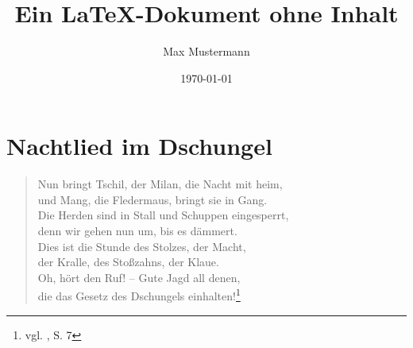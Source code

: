 \documentclass{../hswarticle}
\title{Ein \LaTeX -Dokument ohne Inhalt}
\author{Max Mustermann}
\date{\today}
\begin{document}
    \tableofcontents
    
    \section{Nachtlied im Dschungel}
    
    \begin{quote}
        \glqq Nun bringt Tschil, der Milan, die Nacht mit heim,\\
        und Mang, die Fledermaus, bringt sie in Gang.\\
        Die Herden sind in Stall und Schuppen eingesperrt,\\
        denn wir gehen nun um, bis es d\"{a}mmert.\\
        Dies ist die Stunde des Stolzes, der Macht,\\
        der Kralle, des Sto\ss zahns, der Klaue.\\
        Oh, h\"{o}rt den Ruf! -- Gute Jagd all denen,\\
        die das Gesetz des Dschungels einhalten!\grqq\footnote{vgl. \cite{Kipling1894}, S. 7}
    \end{quote}
    
    
    
\end{document}

